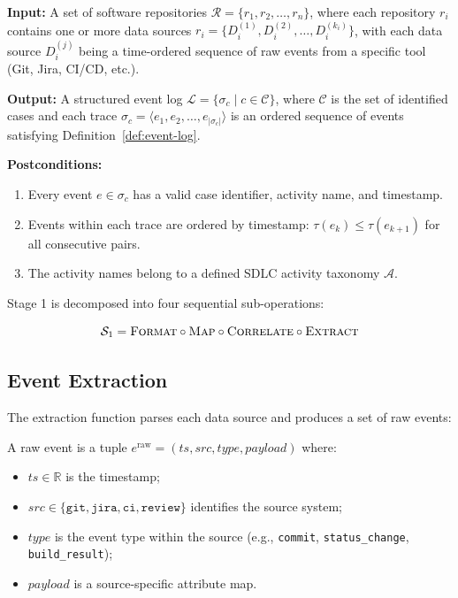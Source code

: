 \begin{definition}
\label{def:contract-s1}
\textbf{Input:} A set of software repositories 
$\mathcal{R} = \{r_1, r_2, \ldots, r_n\}$, where each repository $r_i$ 
contains one or more data sources 
$r_i = \{D_i^{(1)}, D_i^{(2)}, \ldots, D_i^{(k_i)}\}$, with each data 
source $D_i^{(j)}$ being a time-ordered sequence of raw events from a 
specific tool (Git, Jira, CI/CD, etc.).

\textbf{Output:} A structured event log 
$\mathcal{L} = \{\sigma_c \mid c \in \mathcal{C}\}$, where $\mathcal{C}$ 
is the set of identified cases and each trace 
$\sigma_c = \langle e_1, e_2, \ldots, e_{|\sigma_c|} \rangle$ is an 
ordered sequence of events satisfying Definition~\ref{def:event-log}.

\textbf{Postconditions:}
\begin{enumerate}
    \item Every event $e \in \sigma_c$ has a valid case identifier, 
    activity name, and timestamp.
    \item Events within each trace are ordered by timestamp: 
    $\tau(e_k) \leq \tau(e_{k+1})$ for all consecutive pairs.
    \item The activity names belong to a defined SDLC activity taxonomy 
    $\mathcal{A}$.
\end{enumerate}
\end{definition}

Stage 1 is decomposed into four sequential sub-operations:

\begin{equation}
\label{eq:s1-decomposition}
\mathcal{S}_1 = \textsc{Format} \circ \textsc{Map} \circ \textsc{Correlate} \circ \textsc{Extract}
\end{equation}


\subsection{Event Extraction}
\label{sec:s1-extraction}

The extraction function parses each data source and produces a set of 
raw events:

\begin{definition}
\label{def:raw-event}
A raw event is a tuple $e^{\text{raw}} = (ts, src, type, payload)$ where:
\begin{itemize}
    \item $ts \in \mathbb{R}$ is the timestamp;
    \item $src \in \{\texttt{git}, \texttt{jira}, \texttt{ci}, \texttt{review}\}$ 
    identifies the source system;
    \item $type$ is the event type within the source 
    (e.g., \texttt{commit}, \texttt{status\_change}, \texttt{build\_result});
    \item $payload$ is a source-specific attribute map.
\end{itemize}
\end{definition}

